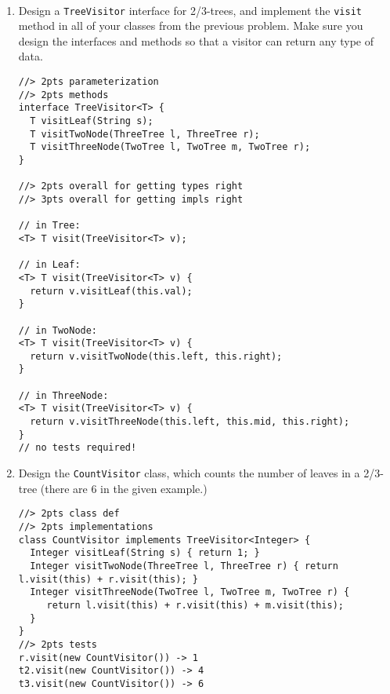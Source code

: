 \documentclass[12pt]{article}                   %
\def\pts#1{\marginpar{\footnotesize \raggedright  \fbox{#1 {\sc Points}}}}
\newenvironment{solution}{\color{red}}{}
\begin{document}
\begin{problem}\pts{22}
\
\begin{enumerate}
\item Design a \verb|TreeVisitor| interface for 2/3-trees, and implement the
\verb|visit| method in all of your classes from the previous problem.
Make sure you design the interfaces and methods so that a visitor can
return any type of data.

\begin{solution}
\begin{verbatim}
//> 2pts parameterization
//> 2pts methods
interface TreeVisitor<T> {
  T visitLeaf(String s);
  T visitTwoNode(ThreeTree l, ThreeTree r);
  T visitThreeNode(TwoTree l, TwoTree m, TwoTree r);
}

//> 2pts overall for getting types right
//> 3pts overall for getting impls right

// in Tree:
<T> T visit(TreeVisitor<T> v);

// in Leaf:
<T> T visit(TreeVisitor<T> v) { 
  return v.visitLeaf(this.val);
}

// in TwoNode:
<T> T visit(TreeVisitor<T> v) { 
  return v.visitTwoNode(this.left, this.right);
}

// in ThreeNode:
<T> T visit(TreeVisitor<T> v) { 
  return v.visitThreeNode(this.left, this.mid, this.right);
}
// no tests required!
\end{verbatim}
\end{solution}

\newpage

\ifrubric{}
\newpage
\fi


\item Design the \verb|CountVisitor| class, which counts the number of
leaves in a 2/3-tree (there are 6 in the given example.)

\begin{solution}
\begin{verbatim}
//> 2pts class def
//> 2pts implementations
class CountVisitor implements TreeVisitor<Integer> {
  Integer visitLeaf(String s) { return 1; }
  Integer visitTwoNode(ThreeTree l, ThreeTree r) { return l.visit(this) + r.visit(this); }
  Integer visitThreeNode(TwoTree l, TwoTree m, TwoTree r) { 
     return l.visit(this) + r.visit(this) + m.visit(this);
  }
}
//> 2pts tests
r.visit(new CountVisitor()) -> 1
t2.visit(new CountVisitor()) -> 4
t3.visit(new CountVisitor()) -> 6
\end{verbatim}
\end{solution}


\end{enumerate}
\end{problem}
\end{document}
